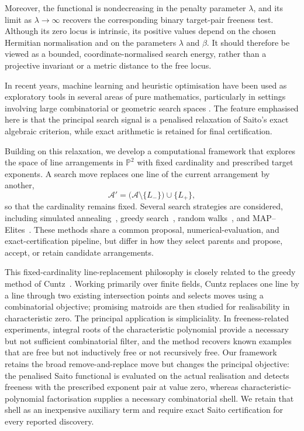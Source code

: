 \documentclass[pdflatex,sn-mathphys-num]{sn-jnl}%
\theoremstyle{remark}
\theoremstyle{definition}
\begin{document}
Moreover, the functional is nondecreasing in the penalty parameter $\lambda$, and its limit as $\lambda\to\infty$ recovers the corresponding binary target-pair freeness test. Although its zero locus is intrinsic, its positive values depend on the chosen Hermitian normalisation and on the parameters $\lambda$ and $\beta$. It should therefore be viewed as a bounded, coordinate-normalised search energy, rather than a projective invariant or a metric distance to the free locus.

In recent years, machine learning and heuristic optimisation have been used as exploratory tools in several areas of pure mathematics, particularly in settings involving large combinatorial or geometric search spaces \cite{He2022,He2023,He2025,Davies2021,Berglund2024,Gukov2021,Gukov2025,
heyes2026neuralnumericalmethodsmathrmg2structures, hirst2026minimisingwillmoreenergyneural,Aggarwal2024}. The feature emphasised here is that the principal search signal is a penalised relaxation of Saito's exact algebraic criterion, while exact arithmetic is retained for final certification.

Building on this relaxation, we develop a computational framework that explores the space of line arrangements in $\mathbb P^2$ with fixed cardinality and prescribed target exponents. A search move replaces one line of the current arrangement by another,
\[
\mathcal{A}'
=
\bigl(\mathcal{A}\setminus\{L_-\}\bigr)\cup\{L_+\},
\]
so that the cardinality remains fixed. Several search strategies are considered, including simulated annealing~\cite{Kirkpatrick1983}, greedy search~\cite{Cuntz2021}, random walks~\cite{Solis1981}, and MAP--Elites~\cite{mouret2015illuminatingsearchspacesmapping, Cully2018-nm}. These methods share a common proposal, numerical-evaluation, and exact-certification pipeline, but differ in how they select parents and propose, accept, or retain candidate arrangements.

This fixed-cardinality line-replacement philosophy is closely related to the greedy method of Cuntz~\cite{Cuntz2021}. Working primarily over finite fields, Cuntz replaces one line by a line through two existing intersection points and selects moves using a combinatorial objective; promising matroids are then studied for realisability in characteristic zero. The principal application is simpliciality. In freeness-related experiments, integral roots of the characteristic polynomial provide a necessary but not sufficient combinatorial filter, and the method recovers known examples that are free but not inductively free or not recursively free. Our framework retains the broad remove-and-replace move but changes the principal objective: the penalised Saito functional is evaluated on the actual realisation and detects freeness with the prescribed exponent pair at value zero, whereas characteristic-polynomial factorisation supplies a necessary combinatorial shell. We retain that shell as an inexpensive auxiliary term and require exact Saito certification for every reported discovery.
\end{document}
